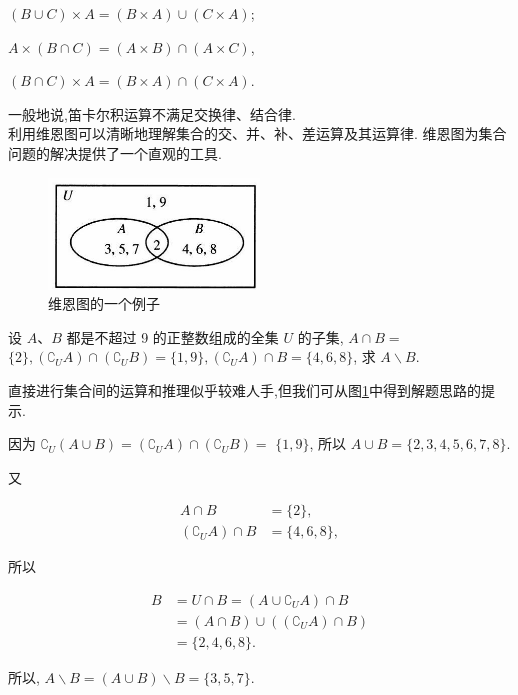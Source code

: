 $(B \cup C) \times A=(B \times A) \cup(C \times A)$;

$A \times(B \cap C)=(A \times B) \cap(A \times C)$,

$(B \cap C) \times A=(B \times A) \cap(C \times A)$.

一般地说,笛卡尔积运算不满足交换律、结合律.\\
利用维恩图可以清晰地理解集合的交、并、补、差运算及其运算律. 维恩图为集合问题的解决提供了一个直观的工具.
\begin{figure}[ht]
	\centering
	\includegraphics[width=0.5\textwidth]{images/2024_05_17_3b020e8fe1313185a92eg-014.jpg}
	\caption{维恩图的一个例子}
	\label{fig:Venn}
\end{figure}

\begin{example}
设 $A 、 B$ 都是不超过 9 的正整数组成的全集 $U$ 的子集, $A \cap B=$ $\{2\},\left(\complement_{U} A\right) \cap\left(\complement_{U} B\right)=\{1,9\},\left(\complement_{U} A\right) \cap B=\{4,6,8\}$, 求 $A \backslash B$.
\end{example}

\begin{analysis}
直接进行集合间的运算和推理似乎较难人手,但我们可从图\ref{fig:Venn}中得到解题思路的提示.
\end{analysis}

\begin{solution}
因为 $\complement_{U}(A \cup B)=\left(\complement_{U} A\right) \cap\left(\complement_{U} B\right)=$ $\{1,9\}$, 所以 $A \cup B=\{2,3,4,5,6,7,8\}$.

又

$$
\begin{aligned}
A \cap B & =\{2\}, \\
\left(\complement_{U} A\right) \cap B & =\{4,6,8\},
\end{aligned}
$$




所以

$$
\begin{aligned}
B & =U \cap B=\left(A \cup \complement_{U} A\right) \cap B \\
& =(A \cap B) \cup\left(\left(\complement_{U} A\right) \cap B\right) \\
& =\{2,4,6,8\} .
\end{aligned}
$$

所以, $A \backslash B=(A \cup B) \backslash B=\{3,5,7\}$.

\end{solution}

